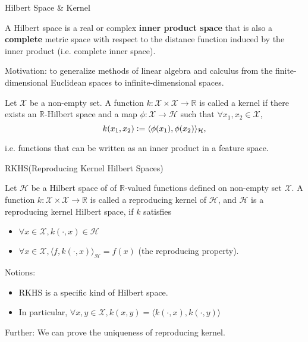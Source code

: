 

\begin{frame}{Hilbert Space \& Kernel}
\begin{definition}
	A Hilbert space is a real or complex \textbf{inner product space} that is also a \textbf{complete} metric space with respect to the distance function induced by the inner product (i.e. complete inner space).
\end{definition}

Motivation: to generalize methods of linear algebra and calculus from the finite-dimensional Euclidean spaces to infinite-dimensional spaces.

\begin{definition}[Kernel]
Let $\mathcal X$ be a non-empty set. 
A function $k: \mathcal X \times \mathcal X\rightarrow \mathbb{R}$ is called a kernel if there exists an $\mathbb R$-Hilbert space and a map $\phi:\mathcal X \rightarrow \mathcal H$ such that $\forall x_1, x_2\in \mathcal X$, 
\begin{equation}
	k(x_1, x_2) \vcentcolon= \langle\phi(x_1),\phi(x_2)\rangle_{\mathcal H},
\end{equation}   
\end{definition}
i.e. functions that can be written as an inner product in a feature space.

\end{frame}



\begin{frame}{RKHS(Reproducing Kernel Hilbert Spaces)}

\begin{definition}[RKHS]
Let $\mathcal{H}$ be a Hilbert space of of $\mathbb R$-valued functions defined on non-empty set $\mathcal X$.
A function $k: \mathcal X \times \mathcal X \rightarrow \mathbb R $ is called a reproducing kernel of $\mathcal{H}$, and $\mathcal{H}$ is a reproducing kernel Hilbert space, if $k$ satisfies 
\begin{itemize}
	\item $\forall x\in \mathcal X, k(\cdot,x)\in \mathcal H$
	\item $\forall x\in \mathcal X, \langle f, k(\cdot, x)\rangle_{\mathcal H} = f(x)$ (the reproducing property).
\end{itemize}
	
\end{definition}
Notions:
\begin{itemize}
	\item RKHS is a specific kind of Hilbert space.
	\item In particular, $\forall x, y \in \mathcal X, k(x, y)=\langle k(\cdot,x), k(\cdot,y)\rangle$
\end{itemize}

Further:
We can prove the uniqueness of reproducing kernel.

\end{frame}

